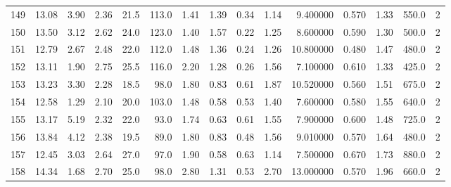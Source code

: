\documentclass{article}
\begin{document}
\begin{tabular}{lrrrrrrrrrrrrrr}
    149 &    13.08 &        3.90 &  2.36 &               21.5 &      113.0 &           1.41 &        1.39 &                  0.34 &             1.14 &         9.400000 &  0.570 &                          1.33 &    550.0 &      2 \\
    150 &    13.50 &        3.12 &  2.62 &               24.0 &      123.0 &           1.40 &        1.57 &                  0.22 &             1.25 &         8.600000 &  0.590 &                          1.30 &    500.0 &      2 \\
    151 &    12.79 &        2.67 &  2.48 &               22.0 &      112.0 &           1.48 &        1.36 &                  0.24 &             1.26 &        10.800000 &  0.480 &                          1.47 &    480.0 &      2 \\
    152 &    13.11 &        1.90 &  2.75 &               25.5 &      116.0 &           2.20 &        1.28 &                  0.26 &             1.56 &         7.100000 &  0.610 &                          1.33 &    425.0 &      2 \\
    153 &    13.23 &        3.30 &  2.28 &               18.5 &       98.0 &           1.80 &        0.83 &                  0.61 &             1.87 &        10.520000 &  0.560 &                          1.51 &    675.0 &      2 \\
    154 &    12.58 &        1.29 &  2.10 &               20.0 &      103.0 &           1.48 &        0.58 &                  0.53 &             1.40 &         7.600000 &  0.580 &                          1.55 &    640.0 &      2 \\
    155 &    13.17 &        5.19 &  2.32 &               22.0 &       93.0 &           1.74 &        0.63 &                  0.61 &             1.55 &         7.900000 &  0.600 &                          1.48 &    725.0 &      2 \\
    156 &    13.84 &        4.12 &  2.38 &               19.5 &       89.0 &           1.80 &        0.83 &                  0.48 &             1.56 &         9.010000 &  0.570 &                          1.64 &    480.0 &      2 \\
    157 &    12.45 &        3.03 &  2.64 &               27.0 &       97.0 &           1.90 &        0.58 &                  0.63 &             1.14 &         7.500000 &  0.670 &                          1.73 &    880.0 &      2 \\
    158 &    14.34 &        1.68 &  2.70 &               25.0 &       98.0 &           2.80 &        1.31 &                  0.53 &             2.70 &        13.000000 &  0.570 &                          1.96 &    660.0 &      2 \\

\end{tabular}
\end{document}

